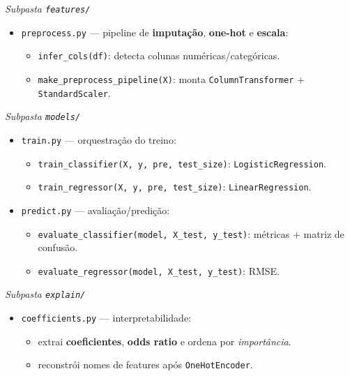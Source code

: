 \documentclass[12pt,a4paper]{article}
\begin{document}
\emph{Subpasta \texttt{features/}}
\begin{itemize}
  \item \texttt{preprocess.py} --- pipeline de \textbf{imputação}, \textbf{one-hot} e \textbf{escala}:
  \begin{itemize}
    \item \texttt{infer\_cols(df)}: detecta colunas numéricas/categóricas.
    \item \texttt{make\_preprocess\_pipeline(X)}: monta \texttt{ColumnTransformer} + \texttt{StandardScaler}.
  \end{itemize}
\end{itemize}

\emph{Subpasta \texttt{models/}}
\begin{itemize}
  \item \texttt{train.py} --- orquestração do treino:
  \begin{itemize}
    \item \texttt{train\_classifier(X, y, pre, test\_size)}: \texttt{LogisticRegression}.
    \item \texttt{train\_regressor(X, y, pre, test\_size)}: \texttt{LinearRegression}.
  \end{itemize}
  \item \texttt{predict.py} --- avaliação/predição:
  \begin{itemize}
    \item \texttt{evaluate\_classifier(model, X\_test, y\_test)}: métricas + matriz de confusão.
    \item \texttt{evaluate\_regressor(model, X\_test, y\_test)}: RMSE.
  \end{itemize}
\end{itemize}

\emph{Subpasta \texttt{explain/}}
\begin{itemize}
  \item \texttt{coefficients.py} --- interpretabilidade:
  \begin{itemize}
    \item extrai \textbf{coeficientes}, \textbf{odds ratio} e ordena por \textit{importância}.
    \item reconstrói nomes de features após \texttt{OneHotEncoder}.
  \end{itemize}
\end{itemize}
\end{document}
